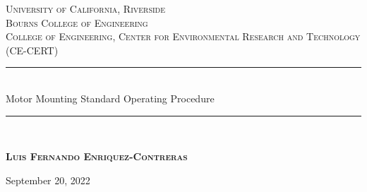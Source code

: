 \documentclass[12pt, a4paper]{article}
\begin{document}
	\begin{titlepage}
		
		\newcommand{\HRule}{\rule{\linewidth}{0.5mm}} %
		
		\center %
		
		
		\textsc{\LARGE University of California, Riverside}\\[1.5cm] %
		\textsc{\Large Bourns College of Engineering}\\[0.5cm] %
		\textsc{\large College of Engineering, Center for Environmental Research and Technology (CE-CERT) }\\[0.5cm] %
		
		
		\HRule \\[0.6cm]
		{\Large Motor Mounting Standard Operating Procedure }\\[0.4cm] %
		\HRule \\[1.0cm]
		
		
		\begin{center} \large
			\medskip
			{\textsc{\textbf{Luis Fernando Enriquez-Contreras} }} 
		\end{center}
		
		
		\begin{center}
			{\large September 20, 2022}
		\end{center}
		

\end{titlepage}
\end{document}
